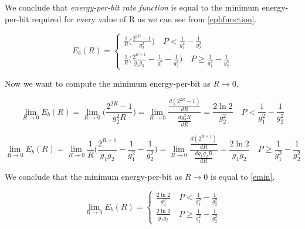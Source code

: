 We conclude that \textit{energy-per-bit rate function} is equal to the minimum energy-per-bit required for every value of R as we can see from \eqref{epbfunction}.

\begin{equation} E_b(R)=
	\begin{cases}
		\frac{1}{R}\Big(\frac{2^{2R}-1}{g_2^2}\Big) \quad P < \frac{1}{g_1^2} - \frac{1}{g_2^2}  \\
		\frac{1}{R} \Big(\frac{2^{R+1}}{g_1g_2} -\frac{1}{g_1^2} - \frac{1}{g_2^2} \Big)  \quad P \geq \frac{1}{g_1^2} - \frac{1}{g_2^2}
	\end{cases}
	\label{epbfunction}
\end{equation}

Now we want to compute the minimum energy-per-bit as $R \rightarrow 0$.


\begin{equation}
	\lim_{R \rightarrow 0} E_b(R) =
		\lim_{R \rightarrow 0} \Big(\frac{2^{2R}-1}{g_2^2 R}\Big) = \lim_{R \rightarrow 0} \frac{ \frac{d(2^{2R}-1)}{dR}} {\frac{dg_2^2 R}{dR}}=\frac{2\ln{2}}{g_2^2} \quad P < \frac{1}{g_1^2} - \frac{1}{g_2^2}
\end{equation}

\begin{equation}
		\lim_{R \rightarrow 0} E_b(R) =
		\lim_{R \rightarrow 0} \frac{1}{R} \Big(\frac{2^{R+1}}{g_1g_2} -\frac{1}{g_1^2} - \frac{1}{g_2^2} \Big) = \lim_{R \rightarrow 0} \frac{ \frac{d(2^{R+1})}{dR}} {\frac{dg_1g_2 R}{dR}}=\frac{2\ln{2}}{g_1g_2}  \quad P \geq \frac{1}{g_1^2} - \frac{1}{g_2^2}
\end{equation}

We conclude that the minimum energy-per-bit as $R \rightarrow 0$ is equal to \eqref{emin}.

\begin{equation}
	\lim_{R \rightarrow 0} E_b(R) = \begin{cases}
		\frac{2\ln{2}}{g_2^2} \quad P < \frac{1}{g_1^2} - \frac{1}{g_2^2} \\
		\frac{2\ln{2}}{g_1g_2} \quad P \geq \frac{1}{g_1^2} - \frac{1}{g_2^2}
\end{cases}
\label{emin}
\end{equation}

